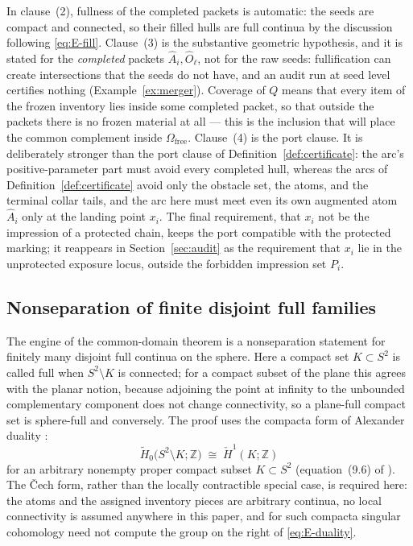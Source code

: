 \documentclass[11pt,reqno]{amsart}
\theoremstyle{definition}
\theoremstyle{remark}
\newcommand{\Z}{\mathbb Z}
\newcommand{\Omfree}{\Omega_{\mathrm{free}}}
\begin{document}
In clause~(2), fullness of the completed packets is automatic: the seeds are compact
and connected, so their filled hulls are full continua by the discussion following
\eqref{eq:E-fill}. Clause~(3) is the substantive geometric hypothesis, and it is
stated for the \emph{completed} packets $\widehat A_i,\widehat O_\ell$, not for the
raw seeds: fullification can create intersections that the seeds do not have, and an
audit run at seed level certifies nothing (Example~\ref{ex:merger}). Coverage of $Q$
means that every item of the frozen inventory lies inside some completed packet, so
that outside the packets there is no frozen material at all --- this is the inclusion
that will place the common complement inside $\Omfree$. Clause~(4) is the port
clause. It is deliberately stronger than the port clause of
Definition~\ref{def:certificate}: the arc's positive-parameter part must avoid every
completed hull, whereas the arcs of Definition~\ref{def:certificate} avoid only the
obstacle set, the atoms, and the terminal collar tails, and the arc here must meet
even its own augmented atom $\widehat A_i$ only at the landing point $x_i$. The final requirement,
that $x_i$ not be the impression of a protected chain, keeps the port compatible with
the protected marking; it reappears in Section~\ref{sec:audit} as the requirement
that $x_i$ lie in the unprotected exposure locus, outside the forbidden impression
set $P_i$.

\subsection{Nonseparation of finite disjoint full families}\label{subsec:E-duality}

The engine of the common-domain theorem is a nonseparation statement for finitely
many disjoint full continua on the sphere. Here a compact set $K\subset S^2$ is
called full when $S^2\setminus K$ is connected; for a compact subset of the plane
this agrees with the planar notion, because adjoining the point at infinity to the
unbounded complementary component does not change connectivity, so a plane-full
compact set is sphere-full and conversely. The proof uses the compacta form of
Alexander duality \cite[pp.~256--257]{Hat02}:
\begin{equation}\label{eq:E-duality}
\widetilde H_0\bigl(S^2\setminus K;\Z\bigr)\;\cong\;\check H^1(K;\Z)
\end{equation}
for an arbitrary nonempty proper compact subset $K\subset S^2$ (equation~(9.6) of
\cite{MWman}). The \v{C}ech form, rather than the locally contractible special case,
is required here: the atoms and the assigned inventory pieces are arbitrary continua,
no local connectivity is assumed anywhere in this paper, and for such compacta
singular cohomology need not compute the group on the right of
\eqref{eq:E-duality}.
\end{document}
